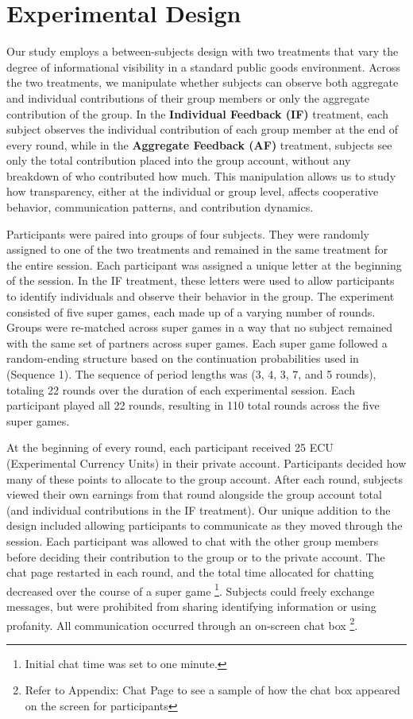 \documentclass[12pt,letterpaper,english]{article}
\begin{document}
\section{Experimental Design}
Our study employs a between-subjects design with two treatments that vary the degree of informational visibility in a standard public goods environment. Across the two treatments, we manipulate whether subjects can observe both aggregate and individual contributions of their group members or only the aggregate contribution of the group. In the \textbf{Individual Feedback (IF)} treatment, each subject observes the individual contribution of each group member at the end of every round, while in the \textbf{Aggregate Feedback (AF)} treatment, subjects see only the total contribution placed into the group account, without any breakdown of who contributed how much. This manipulation allows us to study how transparency, either at the individual or group level, affects cooperative behavior, communication patterns, and contribution dynamics.

Participants were paired into groups of four subjects. They were randomly assigned to one of the two treatments and remained in the same treatment for the entire session. Each participant was assigned a unique letter at the beginning of the session. In the IF treatment, these letters were used to allow participants to identify individuals and observe their behavior in the group. 
The experiment consisted of five super games, each made up of a varying number of rounds. Groups were re-matched across super games in a way that no subject remained with the same set of partners across super games. Each super game followed a random-ending structure based on the continuation probabilities used in \cite{lugovskyy2013repeatedpg} (Sequence 1). The sequence of period lengths was (3, 4, 3, 7, and 5 rounds), totaling 22 rounds over the duration of each experimental session. Each participant played all 22 rounds, resulting in 110 total rounds across the five super games. 

At the beginning of every round, each participant received 25 ECU (Experimental Currency Units) in their private account. Participants decided how many of these points to allocate to the group account. After each round, subjects viewed their own earnings from that round alongside the group account total (and individual contributions in the IF treatment). Our unique addition to the design included allowing participants to communicate as they moved through the session. Each participant was allowed to chat with the other group members before deciding their contribution to the group or to the private account. The chat page restarted in each round, and the total time allocated for chatting decreased over the course of a super game \footnote{Initial chat time was set to one minute.}. Subjects could freely exchange messages, but were prohibited from sharing identifying information or using profanity. All communication occurred through an on-screen chat box \footnote{Refer to Appendix: Chat Page to see a sample of how the chat box appeared on the screen for participants}.
\end{document}
